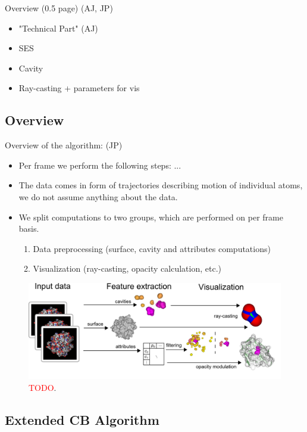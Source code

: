 Overview (0.5 page) (AJ, JP)
\begin{itemize}
  \item "Technical Part" (AJ)
  \item SES
  \item Cavity
  \item Ray-casting + parameters for vis
\end{itemize}

\subsection{Overview}

Overview of the algorithm: (JP)
\begin{itemize}
  \item Per frame we perform the following steps: ...
  \item The data comes in form of trajectories describing motion of individual atoms, we do not assume anything about the data.
  \item We split computations to two groups, which are performed on per frame basis.
	\begin{enumerate}
	  \item Data preprocessing (surface, cavity and attributes computations)
		\item Visualization  (ray-casting, opacity calculation, etc.)
	\end{enumerate}
\end{itemize}

\begin{figure}[htb]
  \centering
  \includegraphics[width=7.3in]{image/overview.png}
  \caption{\textcolor{red}{TODO}.}
	\label{fig:overview}
\end{figure}

\subsection{Extended CB Algorithm}

